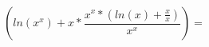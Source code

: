 \documentclass[a4paper,12pt]{article}
\begin{document}
\begin{equation}
\left( {ln \left( {{x }^ {x }}\right) }+ {{x }* {\frac{{{{x }^ {x }}* {\left( {ln \left( {x }\right) }+ {\frac{{x }}{{x }}}\right) }}}{{{x }^ {x }}}}}\right) = 
\end{equation}
\end{document}
